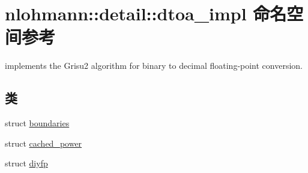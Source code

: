\hypertarget{namespacenlohmann_1_1detail_1_1dtoa__impl}{}\section{nlohmann\+::detail\+::dtoa\+\_\+impl 命名空间参考}
\label{namespacenlohmann_1_1detail_1_1dtoa__impl}


implements the Grisu2 algorithm for binary to decimal floating-\/point conversion.  


\subsection*{类}
\begin{DoxyCompactItemize}
\item 
struct \mbox{\hyperlink{structnlohmann_1_1detail_1_1dtoa__impl_1_1boundaries}{boundaries}}
\item 
struct \mbox{\hyperlink{structnlohmann_1_1detail_1_1dtoa__impl_1_1cached__power}{cached\+\_\+power}}
\item 
struct \mbox{\hyperlink{structnlohmann_1_1detail_1_1dtoa__impl_1_1diyfp}{diyfp}}
\end{DoxyCompactItemize}
